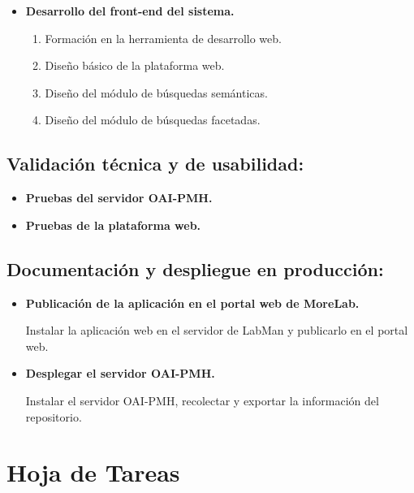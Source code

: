 \begin{itemize}
	\item \textbf{Desarrollo del front-end del sistema.}
	\begin{enumerate}
		\item Formación en la herramienta de desarrollo web.
		\item Diseño básico de la plataforma web.
		\item Diseño del módulo de búsquedas semánticas.
		\item Diseño del módulo de búsquedas facetadas.
	\end{enumerate}	
\end{itemize}

\subsection{Validación técnica y de usabilidad:}

\begin{itemize}
	\item \textbf{Pruebas del servidor OAI-PMH.}
	\item \textbf{Pruebas de la plataforma web.}
\end{itemize}

\subsection{Documentación y despliegue en producción:}

\begin{itemize}
	\item \textbf{Publicación de la aplicación en el portal web de MoreLab.}
	
	Instalar la aplicación web en el servidor de LabMan y publicarlo en el portal web.
	\item \textbf{Desplegar el servidor OAI-PMH.}

	Instalar el servidor OAI-PMH, recolectar y exportar la información del repositorio.
\end{itemize}

\section{Hoja de Tareas}



